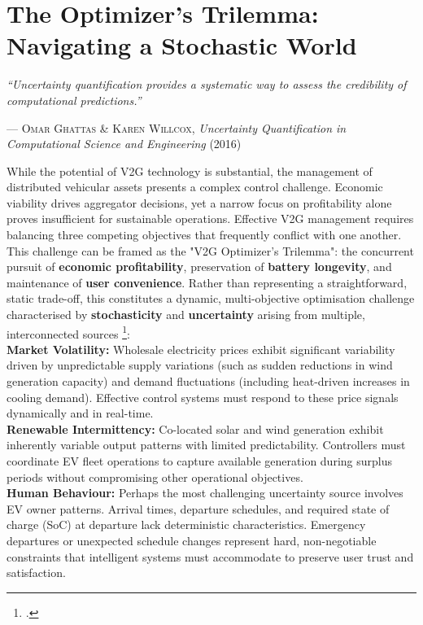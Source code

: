 \section{The Optimizer's Trilemma: Navigating a Stochastic World}
\begin{center}
  \begin{minipage}{0.85\textwidth}
    \begin{displayquote}
      \large\itshape
      ``Uncertainty quantification provides a systematic way to assess the credibility of computational predictions.''
    \end{displayquote}
  \end{minipage}
\end{center}

\vspace{0.5cm}

\begin{flushright}
  --- \textsc{Omar Ghattas \& Karen Willcox}, \textit{Uncertainty Quantification in Computational Science and Engineering} (2016)
\end{flushright}
\noindent
While the potential of V2G technology is substantial, the management of distributed vehicular assets presents a complex control challenge. Economic viability drives aggregator decisions, yet a narrow focus on profitability alone proves insufficient for sustainable operations. Effective V2G management requires balancing three competing objectives that frequently conflict with one another. This challenge can be framed as the "V2G Optimizer's Trilemma": the concurrent pursuit of \textbf{economic profitability}, preservation of \textbf{battery longevity}, and maintenance of \textbf{user convenience}.
\noindent
Rather than representing a straightforward, static trade-off, this constitutes a dynamic, multi-objective optimisation challenge characterised by \textbf{stochasticity} and \textbf{uncertainty} arising from multiple, interconnected sources \footcite{wang2022multi}:
\\
    \noindent
    \textbf{Market Volatility:} Wholesale electricity prices exhibit significant variability driven by unpredictable supply variations (such as sudden reductions in wind generation capacity) and demand fluctuations (including heat-driven increases in cooling demand). Effective control systems must respond to these price signals dynamically and in real-time.
 \\
    \noindent   
\textbf{Renewable Intermittency:} Co-located solar and wind generation exhibit inherently variable output patterns with limited predictability. Controllers must coordinate EV fleet operations to capture available generation during surplus periods without compromising other operational objectives.
    \\
    \noindent
  \textbf{Human Behaviour:} Perhaps the most challenging uncertainty source involves EV owner patterns. Arrival times, departure schedules, and required state of charge (SoC) at departure lack deterministic characteristics. Emergency departures or unexpected schedule changes represent hard, non-negotiable constraints that intelligent systems must accommodate to preserve user trust and satisfaction.

